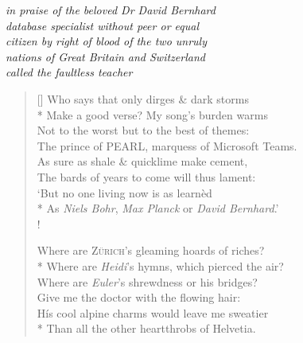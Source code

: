 \begin{center}
    \textit{in praise of the beloved Dr David Bernhard}\\
    \textit{database specialist without peer or equal}\\
    \textit{citizen by right of blood of the two unruly}\\
    \textit{nations of Great Britain and Switzerland}\\
    \textit{called the faultless teacher}
\end{center}

\bigskip

\settowidth{\versewidth}{His cool alpine charms would leave me sweatier}
\begin{verse}[\versewidth]
Who says that only dirges \& dark storms\\*
Make a good verse? My song's burden warms\\
Not to the worst but to the best of themes:\\
The prince of PEARL, marquess of Microsoft Teams.\\
As sure as shale \& quicklime make cement,\\
The bards of years to come will thus lament:\\
`But no one living now is  as learn\`ed\\*
As \textit{Niels Bohr}, \textit{Max Planck} or \textit{David Bernhard}.'\\!

Where are \textsc{Z\"urich}'s gleaming hoards of riches?\\*
\vin Where are \textit{Heidi}'s hymns, which pierced the air?\\
Where are \textit{Euler}'s shrewdness or his bridges?\\
\vin Give me the doctor with the flowing hair:\\
H\'is cool alpine charms would leave me sweatier\\*
Than all the other heartthrobs of Helvetia.
\end{verse}
